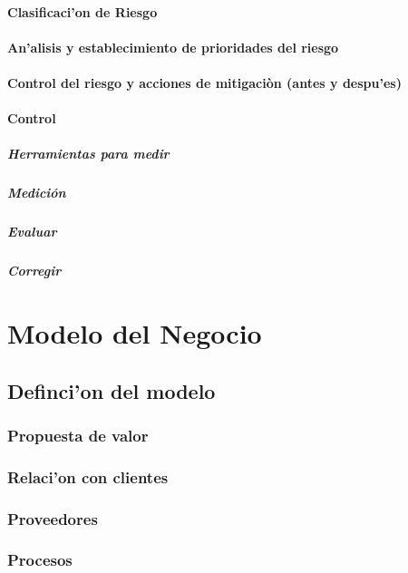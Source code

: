 \documentclass[letterpaper,openright,10pt,oneside]{report}
\begin{document}
			\subsection{Clasificaci'on de Riesgo}
			\subsection{An'alisis y establecimiento de prioridades del riesgo}
			\subsection{Control del riesgo y acciones de mitigaciòn (antes y despu'es)}
			\subsection{Control}
				\subsubsection{Herramientas para medir}
				\subsubsection{Medición}
				\subsubsection{Evaluar}
				\subsubsection{Corregir}
\part{Modelo del Negocio}
	\chapter{Definci'on del modelo}
		\section{Propuesta de valor}
		\section{Relaci'on con clientes}
		\section{Proveedores}
		\section{Procesos}
\end{document}
